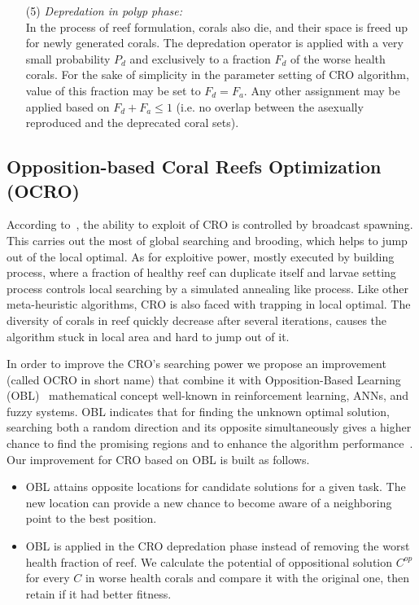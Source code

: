 \documentclass[smallcondensed, natbib]{svjour3}     %
\begin{document}
\begin{enumerate}
\item[(5)] \textit{Depredation in polyp phase:} \\
In the process of reef formulation, corals also die, and their space is freed up for newly generated corals. The depredation operator is applied with a very small probability $P_{d}$ and exclusively to a fraction $F_{d}$ of the worse health corals. For the sake of simplicity in the parameter setting of CRO algorithm, value of this fraction may be set to $F_{d}=F_{a}$. Any other assignment may be applied based on $F_{d}+F_{a}\leq1$ (i.e. no overlap between the asexually reproduced and the deprecated coral sets).
\end{enumerate}

\subsection{Opposition-based Coral Reefs Optimization (OCRO)}		
\label{ocro}

According to~\citep{ref_salcedo_sanz5}, the ability to exploit of CRO is controlled by broadcast spawning. This carries out the most  of global searching and brooding, which helps to jump out of the local optimal. As for exploitive power, mostly executed by building process, where a fraction of healthy reef can duplicate itself and larvae setting process controls local searching by a simulated annealing like process. Like other meta-heuristic algorithms, CRO is also faced with trapping in local optimal. The diversity of corals in reef quickly decrease after several iterations, causes the algorithm stuck in local area and hard to jump out of it. 

In order to improve the CRO's searching power we propose an improvement (called OCRO in short name) that combine it with Opposition-Based Learning (OBL)~\citep{ref_Tizhoosh} mathematical concept well-known in reinforcement learning, ANNs, and fuzzy systems. OBL indicates that for finding the unknown optimal solution, searching both a random direction and its opposite simultaneously gives a higher chance to find the promising regions and to enhance the algorithm performance~\citep{mahdavi2018opposition}. Our improvement for CRO based on OBL is built as follows.

\begin{itemize}
	\item OBL attains opposite locations for candidate solutions for a given task. The new location can provide a new chance to become aware of a neighboring point to the best position. 
	\item OBL is applied in the CRO depredation phase instead of removing the worst health fraction of reef. We calculate the potential of oppositional solution $C^{op}$ for every $C$ in worse health corals and compare it with the original one, then retain if it had better fitness.
\end{itemize}
\end{document}
